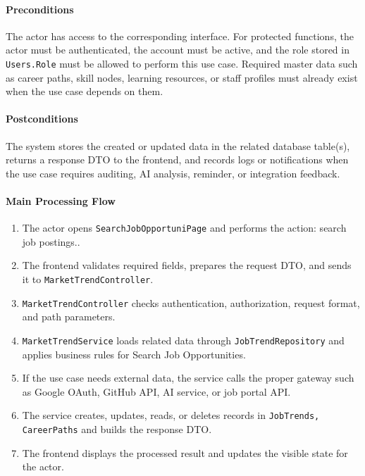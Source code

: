 \paragraph{Preconditions}

The actor has access to the corresponding interface. For protected functions, the actor must be authenticated, the account must be active, and the role stored in \texttt{Users.Role} must be allowed to perform this use case. Required master data such as career paths, skill nodes, learning resources, or staff profiles must already exist when the use case depends on them.

\paragraph{Postconditions}

The system stores the created or updated data in the related database table(s), returns a response DTO to the frontend, and records logs or notifications when the use case requires auditing, AI analysis, reminder, or integration feedback.

\paragraph{Main Processing Flow}

\begin{enumerate}
    \item The actor opens \texttt{SearchJobOpportuniPage} and performs the action: search job postings..
    \item The frontend validates required fields, prepares the request DTO, and sends it to \texttt{MarketTrendController}.
    \item \texttt{MarketTrendController} checks authentication, authorization, request format, and path parameters.
    \item \texttt{MarketTrendService} loads related data through \texttt{JobTrendRepository} and applies business rules for Search Job Opportunities.
    \item If the use case needs external data, the service calls the proper gateway such as Google OAuth, GitHub API, AI service, or job portal API.
    \item The service creates, updates, reads, or deletes records in \texttt{JobTrends, CareerPaths} and builds the response DTO.
    \item The frontend displays the processed result and updates the visible state for the actor.
\end{enumerate}

